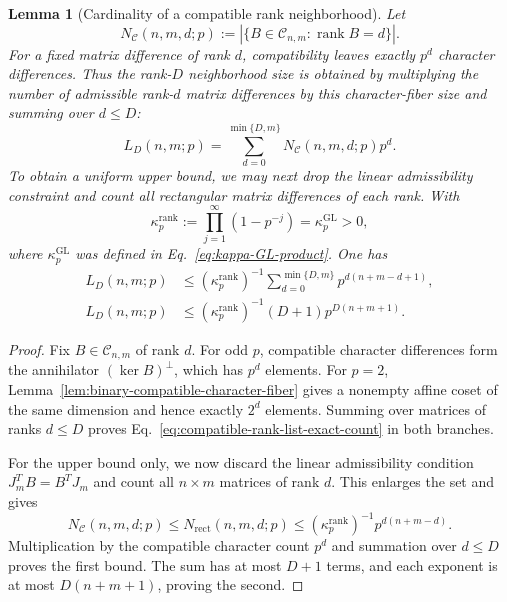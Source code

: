 \documentclass[11pt]{article}
\newcommand{\rank}{\operatorname{rank}}
\newcommand{\1}{\mathbf 1}
\theoremstyle{plain}
\newtheorem{lemma}[theorem]{Lemma}
\theoremstyle{definition}
\theoremstyle{remark}
\begin{document}
\begin{lemma}[Cardinality of a compatible rank neighborhood]
\label{lem:compatible-rank-neighborhood-cardinality}
Let
\begin{equation}
 N_{\mathcal C}(n,m,d;p)
 :=|\{B\in\mathcal C_{n,m}:\rank B=d\}|.
 \label{eq:admissible-rank-count}
\end{equation}
For a fixed matrix difference of rank $d$, compatibility leaves exactly
$p^d$ character differences.  Thus the rank-$D$ neighborhood size is obtained
by multiplying the number of admissible rank-$d$ matrix differences by this
character-fiber size and summing over $d\le D$:
\begin{equation}
 L_D(n,m;p)
 =\sum_{d=0}^{\min\{D,m\}}
 N_{\mathcal C}(n,m,d;p)p^d.
 \label{eq:compatible-rank-list-exact-count}
\end{equation}
To obtain a uniform upper bound, we may next drop the linear admissibility
constraint and count all rectangular matrix differences of each rank.
With
\begin{equation}
 \kappa_p^{\mathrm{rank}}
 :=\prod_{j=1}^{\infty}(1-p^{-j})
 =\kappa_p^{\mathrm{GL}}>0,
 \label{eq:rank-truncated-kappa}
\end{equation}
where $\kappa_p^{\mathrm{GL}}$ was defined in
Eq.~\eqref{eq:kappa-GL-product}.  One has
\begin{align}
 L_D(n,m;p)
 &\le
 (\kappa_p^{\mathrm{rank}})^{-1}
 \sum_{d=0}^{\min\{D,m\}}p^{d(n+m-d+1)},
 \label{eq:compatible-rank-list-rank-sum-bound}\\
 L_D(n,m;p)
 &\le
 (\kappa_p^{\mathrm{rank}})^{-1}(D+1)
 p^{D(n+m+1)}.
 \label{eq:compatible-rank-list-coarse-bound}
\end{align}
\end{lemma}
\begin{proof}
Fix $B\in\mathcal C_{n,m}$ of rank $d$.  For odd $p$, compatible character
differences form the annihilator $(\ker B)^\perp$, which has $p^d$ elements.
For $p=2$, Lemma~\ref{lem:binary-compatible-character-fiber} gives a nonempty
affine coset of the same dimension and hence exactly $2^d$ elements.  Summing
over matrices of ranks $d\le D$ proves
Eq.~\eqref{eq:compatible-rank-list-exact-count} in both branches.

For the upper bound only, we now discard the linear admissibility condition
$J_m^TB=B^TJ_m$ and count all $n\times m$ matrices of rank $d$.  This enlarges
the set and gives
\begin{equation}
 N_{\mathcal C}(n,m,d;p)
 \le N_{\mathrm{rect}}(n,m,d;p)
 \le(\kappa_p^{\mathrm{rank}})^{-1}p^{d(n+m-d)}.
 \label{eq:rank-truncated-rectangular-bound}
\end{equation}
Multiplication by the compatible character count $p^d$ and summation over
$d\le D$ proves the first bound.  The sum has at most $D+1$ terms, and each
exponent is at most $D(n+m+1)$, proving the second.
\end{proof}
\end{document}
